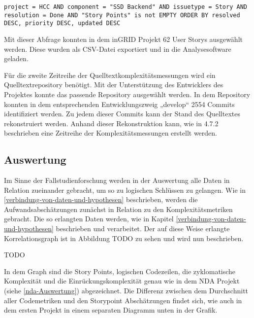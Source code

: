 \lstset{language=SQL}
\begin{lstlisting}
project = HCC AND component = "SSD Backend" AND issuetype = Story AND resolution = Done AND "Story Points" is not EMPTY ORDER BY resolved DESC, priority DESC, updated DESC
\end{lstlisting}

Mit dieser Abfrage konnten in dem inGRID Projekt 62 User Storys
ausgewählt werden. Diese wurden als \ac{CSV}-Datei exportiert und in die
Analysesoftware geladen.

Für die zweite Zeitreihe der Quelltextkomplexitätsmessungen wird ein
Quelltextrepository benötigt. Mit der Unterstützung des Entwicklers des
Projektes konnte das passende Repository ausgewählt werden. In dem
Repository konnten in dem entsprechenden Entwicklungszweig „develop``
2554 Commits identifiziert werden. Zu jedem dieser Commits kann der
Stand des Quelltextes rekonstruiert werden. Anhand dieser Rekonstruktion
kann, wie in 4.7.2 beschrieben eine Zeitreihe der Komplexitätsmessungen
erstellt werden.

\subsection{Auswertung}\label{ingrid-Auswertung}

Im Sinne der Fallstudienforschung werden in der Auswertung alle Daten in
Relation zueinander gebracht, um so zu logischen Schlüssen zu gelangen.
Wie in \ref{verbindung-von-daten-und-hypothesen} beschrieben, werden die Aufwandsabschätzungen zunächst in
Relation zu den Komplexitätsmetriken gebracht. Die so erlangten Daten
werden, wie in Kapitel \ref{verbindung-von-daten-und-hypothesen} beschrieben und verarbeitet. Der auf diese Weise
erlangte Korrelationsgraph ist in Abbildung TODO zu sehen und wird nun
beschrieben.

TODO

In dem Graph sind die Story Points, logischen Codezeilen, die
zyklomatische Komplexität und die Einrückungskomplexität genau wie in
dem NDA Projekt (siehe \ref{nda-Auswertung}) abgezeichnet. Die Differenz zwischen dem
Durchschnitt aller Codemetriken und den Storypoint Abschätzungen findet
sich, wie auch in dem ersten Projekt in einem separaten Diagramm unten
in der Grafik.

